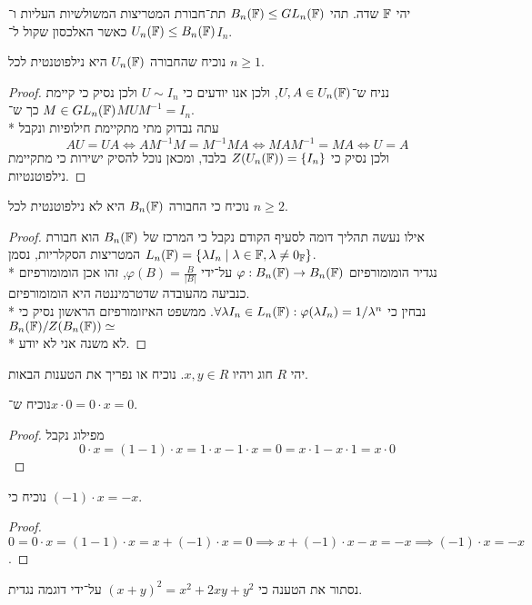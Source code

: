 \Question{}
יהי $\mathbb{F}$ שדה. תהי $B_n(\mathbb{F}) \le GL_n(\mathbb{F})$ תת־חבורת המטריצות המשולשיות העליות ו־$U_n(\mathbb{F}) \le B_n(\mathbb{F})$ כאשר האלכסון שקול ל־$I_n$.

\Subquestion{}
נוכיח שהחבורה $U_n(\mathbb{F})$ היא נילפוטנטית לכל $n \ge 1$.
\begin{proof}
	נניח ש־$U, A \in U_n(\mathbb{F})$, ולכן אנו יודעים כי $U \sim I_n$ ולכן נסיק כי קיימת $M \in GL_n(\mathbb{F})$ כך ש־$M U M^{-1} = I_n$. \\*
	עתה נבדוק מתי מתקיימת חילופיות ונקבל
	\[
		A U = U A
		\iff A M^{-1} M = M^{-1} M A
		\iff M A M^{-1} = M A
		\iff
		U = A
	\]
	ולכן נסיק כי $Z(U_n(\mathbb{F})) = \{ I_n \}$ בלבד, ומכאן נוכל להסיק ישירות כי מתקיימת נילפוטנטיות.
\end{proof}

\Subquestion{}
נוכיח כי החבורה $B_n(\mathbb{F})$ היא לא נילפוטנטית לכל $n \ge 2$.
\begin{proof}
	אילו נעשה תהליך דומה לסעיף הקודם נקבל כי המרכז של $B_n(\mathbb{F})$ הוא חבורת המטריצות הסקלריות, נסמן $L_n(\mathbb{F}) = \{ \lambda I_n \mid \lambda \in \mathbb{F}, \lambda \ne 0_{\mathbb{F}} \}$. \\*
	נגדיר הומומורפיזם $\varphi : B_n(\mathbb{F}) \to B_n(\mathbb{F})$ על־ידי $\varphi(B) = \frac{B}{|B|}$, זהו אכן הומומורפיזם כנביעה מהעובדה שדטרמיננטה היא הומומורפיזם. \\*
	נבחין כי $\forall \lambda I_n \in L_n(\mathbb{F}) : \varphi(\lambda I_n) = 1 / \lambda^n$.
	ממשפט האיזומורפיזם הראשון נסיק כי $B_n(\mathbb{F}) / Z(B_n(\mathbb{F})) \simeq $ \\*
	לא משנה אני לא יודע.
\end{proof}

\Question{}
יהי $R$ חוג ויהיו $x, y \in R$.
נוכיח או נפריך את הטענות הבאות.

\Subquestion{}
נוכיח ש־$x \cdot 0 = 0 \cdot x = 0$.
\begin{proof}
	מפילוג נקבל
	\[
		0 \cdot x = (1 - 1) \cdot x = 1 \cdot x - 1 \cdot x = 0 = x \cdot 1 - x \cdot 1 = x \cdot 0
	\]
\end{proof}

\Subquestion{}
נוכיח כי $(-1) \cdot x = -x$.
\begin{proof}
	$0 = 0 \cdot x = (1 - 1) \cdot x = x + (-1) \cdot x = 0 \implies x + (-1) \cdot x - x = -x \implies (-1) \cdot x = -x$.
\end{proof}

\Subquestion{}
נסתור את הטענה כי ${(x + y)}^2 = x^2 + 2xy + y^2$ על־ידי דוגמה נגדית.


